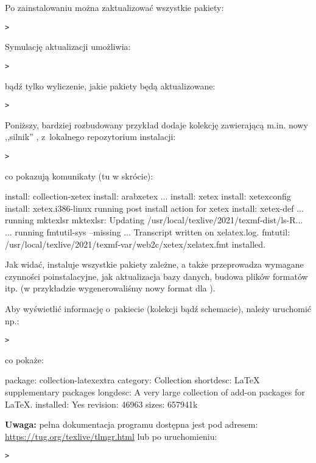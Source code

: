 \documentclass{article}
\begin{document}
Po zainstalowaniu \TL{} można zaktualizować wszystkie pakiety:
\begin{alltt}
> 
\end{alltt}
Symulację aktualizacji umożliwia:
\begin{alltt}
> 
\end{alltt}
bądź tylko wyliczenie, jakie pakiety będą aktualizowane:
\begin{alltt}
> 
\end{alltt}

Poniższy, bardziej rozbudowany przykład dodaje kolekcję zawierającą m.in. nowy ,,silnik'' \XeTeX,
 z~lokalnego repozytorium instalacji:

\begin{alltt}
> 
\end{alltt}
co pokazują komunikaty (tu w skrócie):
\begin{fverbatim}
install: collection-xetex
install: arabxetex
...
install: xetex
install: xetexconfig
install: xetex.i386-linux
running post install action for xetex
install: xetex-def
...
running mktexlsr
mktexlsr: Updating /usr/local/texlive/2021/texmf-dist/ls-R...
...
running fmtutil-sys --missing
...
Transcript written on xelatex.log.
fmtutil: /usr/local/texlive/2021/texmf-var/web2c/xetex/xelatex.fmt installed.
\end{fverbatim}

Jak widać,  instaluje wszystkie pakiety zależne, a także
przeprowadza wymagane czynności poinstalacyjne, jak aktualizacja bazy
danych, budowa plików formatów itp. (w przykładzie wygenerowaliśmy
nowy format dla \XeTeX).

Aby wyświetlić informację o~pakiecie (kolekcji bądź schemacie), należy
uruchomić np.:
\begin{alltt}
> 
\end{alltt}
co pokaże:
\begin{fverbatim}
package:    collection-latexextra
category:   Collection
shortdesc:  LaTeX supplementary packages
longdesc:   A very large collection of add-on packages for LaTeX.
installed:  Yes
revision:   46963
sizes:      657941k
\end{fverbatim}

\noindent
\textbf{Uwaga:} pełna dokumentacja programu  dostępna
jest pod adresem:
\url{https://tug.org/texlive/tlmgr.html} lub po uruchomieniu:
\begin{alltt}
> 
\end{alltt}
\end{document}

